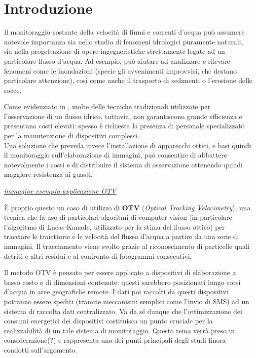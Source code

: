\chapter{Introduzione}

Il monitoraggio costante della velocità di fiumi e correnti d'acqua può assumere notevole importanza sia nello studio di 
fenomeni idrologici puramente naturali, sia nella progettazione di opere ingegneristiche strettamente legate ad un 
particolare flusso d'acqua. Ad esempio, può aiutare ad analizzare e rilevare fenomeni come le inondazioni (specie gli 
avvenimenti improvvisi, che destano particolare attenzione), così come anche il trasporto di sedimenti o 
l'erosione delle rocce.

Come evidenziato in \cite{rs10122010}, molte delle tecniche tradizionali utilizzate per l'osservazione di un flusso idrico, tuttavia, non garantiscono 
grande efficienza e presentano costi elevati: spesso è richiesta la presenza di personale specializzato per la 
manutenzione di dispositivi complessi.\\ %
Una soluzione che preveda invece l'installazione di apparecchi ottici, e basi quindi il monitoraggio sull'elaborazione di
immagini, può consentire di abbattere notevolmente i costi e di distribuire il sistema di osservazione ottenendo quindi 
maggiore resistenza ai guasti.%

\textit{\underline{immagine esempio applicazione OTV}}

È proprio questo un caso di utilizzo di \textbf{OTV} (\textit{Optical Tracking Velocimetry}), una tecnica che fa uso di 
particolari algoritmi di computer vision (in particolare l'algoritmo di Lucas-Kanade, utilizzato per la stima del flusso 
ottico) per tracciare le traiettorie e le velocità del flusso d'acqua a partire da una serie di immagini. 
Il tracciamento viene svolto grazie al riconoscimento di particelle quali detriti e altri residui e al confronto di fotogrammi 
consecutivi.

Il metodo OTV è pensato per essere applicato a dispositivi di elaborazione a basso costo e di dimensioni contenute: questi
sarebbero posizionati lungo corsi d'acqua in aree geografiche remote. I dati poi raccolti da questi dispositivi potranno essere
spediti (tramite meccanismi semplici come l'invio di SMS) ad un sistema di raccolta dati centralizzato.
Va da sé dunque che l'ottimizzazione dei consumi energetici dei dispositivi costituisca un punto cruciale per la 
realizzabilità di un tale sistema di monitoraggio. Questo tema verrà preso in considerazione(?) e rappresenta uno dei punti
principali degli studi finora condotti sull'argomento.\\

